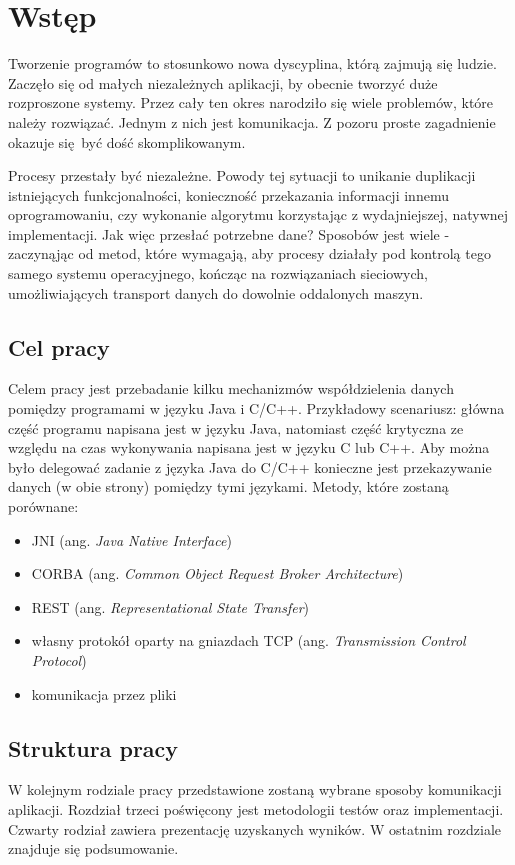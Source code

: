 \chapter{Wstęp}

Tworzenie programów to stosunkowo nowa dyscyplina, którą zajmują się ludzie. Zaczęło się od małych niezależnych aplikacji, by obecnie tworzyć duże rozproszone systemy. Przez cały ten okres narodziło się wiele problemów, które należy rozwiązać. Jednym z nich jest komunikacja. Z pozoru proste zagadnienie okazuje się być dość skomplikowanym.

Procesy przestały być niezależne. Powody tej sytuacji to unikanie duplikacji istniejących funkcjonalności, konieczność przekazania informacji innemu oprogramowaniu, czy wykonanie algorytmu korzystając z wydajniejszej, natywnej implementacji. Jak więc przesłać potrzebne dane? Sposobów jest wiele - zaczynąjąc od metod, które wymagają, aby procesy działały pod kontrolą tego samego systemu operacyjnego, kończąc na rozwiązaniach sieciowych, umożliwiających transport danych do dowolnie oddalonych maszyn.


\section{Cel pracy}

Celem pracy jest przebadanie kilku mechanizmów współdzielenia  danych pomiędzy programami w języku Java i C/C++. 
Przykładowy scenariusz: główna część programu napisana jest w języku Java, natomiast część krytyczna ze względu na czas wykonywania napisana jest w języku C lub C++. Aby można było delegować zadanie z języka Java do C/C++ konieczne jest przekazywanie danych (w obie strony) pomiędzy tymi językami. Metody, które zostaną porównane:
\begin{itemize}
	\item JNI (ang. \textit{Java Native Interface})
	\item CORBA (ang. \textit{Common Object Request Broker Architecture})
	\item REST (ang. \textit{Representational State Transfer})
	\item własny protokół oparty na gniazdach TCP (ang. \textit{Transmission Control Protocol})
	\item komunikacja przez pliki
\end{itemize}


\section{Struktura pracy}

W kolejnym rodziale pracy przedstawione zostaną wybrane sposoby komunikacji aplikacji.
Rozdział trzeci poświęcony jest metodologii testów oraz implementacji.
Czwarty rodział zawiera prezentację uzyskanych wyników.
W ostatnim rozdziale znajduje się podsumowanie.
